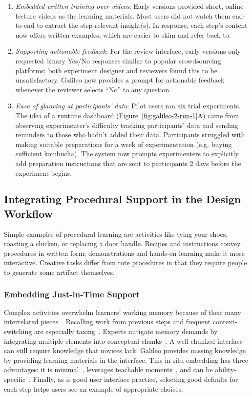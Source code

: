 \begin{enumerate}
\item \textit{Embedded written training over videos}: Early versions provided short, online lecture videos as the learning materials. Most users did not watch them end-to-end to extract the step-relevant insight(s). In response, each step's content now offers written examples, which are easier to skim and refer back to. 

\item \textit{Supporting actionable feedback}: For the review interface, early versions only requested binary Yes/No responses similar to popular crowdsourcing platforms; both experiment designer and reviewers found this to be unsatisfactory. Galileo now provides a prompt for actionable feedback whenever the reviewer selects “No” to any question. 

\item \textit{Ease of glancing at participants' data}: Pilot users ran six trial experiments. The idea of a runtime dashboard (Figure~\ref{fig:galileo-2-run-1}A) came from observing experimenter's difficulty tracking participants' data and sending reminders to those who hadn't added their data. Participants struggled with making suitable preparations for a week of experimentation (e.g. buying sufficient kombucha). The system now prompts experimenters to explicitly add preparation instructions that are sent to participants 2 days before the experiment begins. 
\end{enumerate}

\subsection{Integrating Procedural Support in the Design Workflow}
Simple examples of procedural learning are activities like tying your shoes, roasting a chicken, or replacing a door handle. Recipes and instructions convey procedures in written form; demonstrations and hands-on learning make it more interactive. Creative tasks differ from rote procedures in that they require people to generate some artifact themselves.

\subsubsection{Embedding Just-in-Time Support}
Complex activities overwhelm learners' working memory because of their many interrelated pieces~\cite{Engle2002}. Recalling work from previous steps and frequent context-switching are especially taxing~\cite{Gonzalez2004}. Experts mitigate memory demands by integrating multiple elements into conceptual chunks~\cite{Chase1973}. A well-chunked interface can still require knowledge that novices lack. Galileo provides missing knowledge by providing learning materials in the interface. This in-situ embedding has three advantages: it is minimal~\cite{Carroll1987}, leverages teachable moments~\cite{Havighurst1953}, and can be ability-specific~\cite{Corbett1997}. Finally, as is good user interface practice, selecting good defaults for each step helps users see an example of appropriate choices. 

